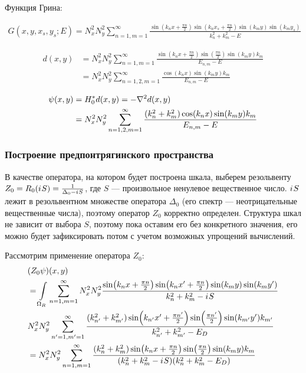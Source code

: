 Функция Грина:

\begin{align*}
G(x, y, x_s, y_s; E) = N_x^2 N_y^2 \sum\limits_{n = 1, m = 1}^\infty \frac{\sin(k_n x + \frac{\pi n}{2}) \sin(k_n x_s  + \frac{\pi n}{2}) \sin(k_m y) \sin(k_m y_s)}{k_n^2 + k_m^2 - E}
\end{align*}

\begin{align*}
d(x, y)
&= N_x^2 N_y^2 \sum\limits_{n = 1, m = 1}^\infty \frac{\sin(k_n x + \frac{\pi n}{2}) \sin(\frac{\pi n}{2}) \sin(k_m y) k_m}{E_{n, m} - E} \\
& = N_x^2 N_y^2 \sum\limits_{n = 1,2, m = 1}^\infty \frac{\cos(k_n x) \sin(k_m y) k_m}{E_{n, m} - E}
\end{align*}

\begin{align*}
\psi(x, y)
& = H_0^* d(x, y) = - \laplacian d(x, y) \\
& = N_x^2 N_y^2 \sum\limits_{n = 1,2, m = 1}^\infty \frac{(k_n^2 + k_m^2) \cos(k_n x) \sin(k_m y) k_m}{E_{n, m} - E}
\end{align*}

\subsubsection{Построение предпонтрягинского пространства}
В качестве оператора, на котором будет построена шкала, выберем резольвенту $Z_0 = R_0({i\mkern1mu} S) = \frac{1}{\Delta_0 - {i\mkern1mu} S}$, где $S$ — произвольное ненулевое вещественное число. ${i\mkern1mu} S$ лежит в резольвентном множестве оператора $\Delta_0$ (его спектр — неотрицательные вещественные числа), поэтому оператор $Z_0$ корректно определен. Структура шкал не зависит от выбора $S$, поэтому пока оставим его без конкретного значения, его можно будет зафиксировать потом с учетом возможных упрощений вычислений.

Рассмотрим применение оператора $Z_0$:
\begin{align*}
& (Z_0 \psi)(x, y) \\
&= \int\limits_{\Omega_R} \sum\limits_{n = 1, m = 1}^\infty N_x^2 N_y^2 \frac{\sin(k_n x + \frac{\pi n}{2}) \sin(k_n x' + \frac{\pi n}{2}) \sin(k_m y) \sin(k_m y')}{k^2_n + k^2_m - {i\mkern1mu} S} \\
& N_x^2 N_y^2 \sum\limits_{n' = 1, m' = 1}^\infty \frac{(k_{n'}^2 + k_{m'}^2) \sin(k_{n'} x' + \frac{\pi n'}{2}) \sin(\frac{\pi n'}{2}) \sin(k_{m'} y') k_{m'}}{k_{n'}^2 + k_{m'}^2 - E_D} \\
&= N_x^2 N_y^2 \sum\limits_{n = 1, m = 1}^\infty \frac{(k_n^2 + k_m^2) \sin(k_n x + \frac{\pi n}{2}) \sin(\frac{\pi n}{2}) \sin(k_m y) k_m}{(k_n^2 + k_m^2 - {i\mkern1mu} S) (k_n^2 + k_m^2 - E_D)}
\end{align*}

